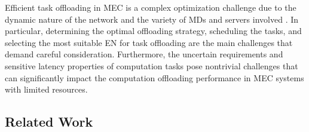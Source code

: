 \documentclass[12pt,draftclsnofoot,onecolumn]{IEEEtran}
\begin{document}
Efficient task offloading in MEC is a complex optimization challenge due to the dynamic nature of the network and the variety of MDs and servers involved \cite{jiang2019toward} \cite{TNSE-WU-24}. In particular, determining the optimal offloading strategy, scheduling the tasks, and selecting the most suitable EN for task offloading are the main challenges that demand careful consideration. Furthermore, the uncertain requirements and sensitive latency properties of computation tasks pose nontrivial challenges that can significantly impact the computation offloading performance in MEC systems with limited resources.

\subsection{Related Work}

\end{document}
